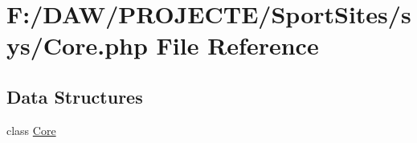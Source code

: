 \hypertarget{_core_8php}{}\section{F\+:/\+D\+A\+W/\+P\+R\+O\+J\+E\+C\+T\+E/\+Sport\+Sites/sys/\+Core.php File Reference}
\label{_core_8php}
\subsection*{Data Structures}
\begin{DoxyCompactItemize}
\item 
class \hyperlink{class_core}{Core}
\end{DoxyCompactItemize}
